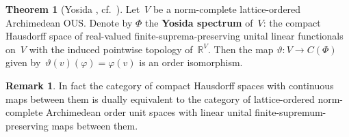 \documentclass[10pt,conference]{IEEEtran}
\newcommand{\R}{\mathbb{R}}
\newcommand\Define[1]{\textbf{#1}}
\newcounter{counter}
\theoremstyle{definition}
\newtheorem{theorem}[counter]{Theorem}
\newtheorem{proposition}[counter]{Proposition}
\newtheorem{remark}[counter]{Remark}
\begin{document}

\begin{theorem}[{Yosida \cite{yosida}, cf.~\cite{westerbaan2016yosida}}]\label{prop:yosida}
Let~$V$ be a norm-complete lattice-ordered Archimedean OUS. Denote by $\Phi$ the \Define{Yosida spectrum} of~$V$:
        the compact Hausdorff space
        of real-valued finite-suprema-preserving unital linear functionals on~$V$
        with the induced pointwise topology of~$\R^V$.
    Then the map $\vartheta \colon V \rightarrow C(\Phi)$
    given by~$\vartheta(v)(\varphi) = \varphi(v)$
    is an order isomorphism.
\end{theorem}
\begin{remark}
    In fact the category of compact Hausdorff spaces with continuous maps between
        them is dually equivalent to the category of lattice-ordered norm-complete Archimedean
            order unit spaces with linear unital finite-supremum-preserving
            maps between them.~\cite{westerbaan2016yosida}
\end{remark}

\end{document}
